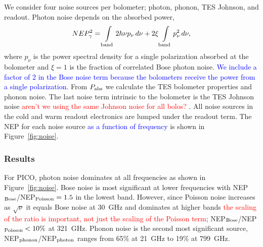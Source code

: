 \documentclass[]{spie}  %
\newcommand{\comr}[1]{\textcolor{red}{#1}}
\newcommand{\comb}[1]{\textcolor{blue}{#1}}
\begin{document}
We consider four noise sources per bolometer; photon, phonon, TES Johnson, and readout. 
Photon noise depends on the absorbed power\cite{richards1994}, 
\begin{equation}
\label{eq:photon}
NEP_{\gamma}^2 = \int\limits_{\rm band} 2h\nu p_{\nu} \, d\nu + 2\xi \int\limits_{\rm band} p_{\nu}^2 \,  d\nu,
\end{equation} 
where $p_{\nu}$ is the power spectral density for a single polarization absorbed at the bolometer and $\xi=1$ is the fraction of correlated Bose 
photon noise. \comb{We include a factor of 2 in the Bose noise term because the bolometers receive the power from a single 
polarization.} 
%
%
From $P_{\rm abs}$ we calculate the TES bolometer properties and phonon noise.\cite{mather1982}  
The last noise term intrinsic to the bolometer is the TES Johnson noise \comr{aren't we using the same
Johnson noise for all bolos?} . All noise sources in the cold and warm readout 
electronics are lumped under the readout term.  The NEP for each noise source \comb{as a function 
of frequency} is shown in Figure~\ref{fig:noise}.




\subsubsection{Results}  %

For PICO, photon noise dominates at all frequencies as shown in Figure~\ref{fig:noise}. Bose noise is most significant 
at lower frequencies with NEP$_{\rm Bose}$/NEP$_{\rm Poisson}= 1.5 $ in the lowest band.  However, since Poisson noise increases as 
$\sqrt{\nu}$ it equals Bose noise at 30~GHz and dominates at higher bands \comr{the scaling of the ratio is important, not just the 
scaling of the Poisson term}; NEP$_{\rm Bose}$/NEP$_{\rm Poisson} <10\%$ at 321~GHz. 
Phonon noise is the second most significant source, NEP$_{\rm phonon}$/NEP$_{\rm photon}$ ranges from 65\% at 21~GHz 
to 19\% at 799~GHz. 
\end{document}
